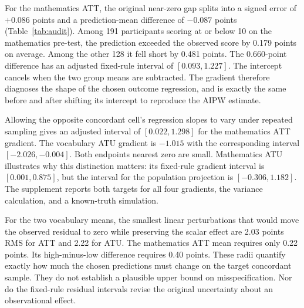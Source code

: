 For the mathematics ATT, the original near-zero gap splits into a signed error of $+0.086$ points and a prediction-mean difference of $-0.087$ points (Table~\ref{tab:audit}). Among 191 participants scoring at or below 10 on the mathematics pre-test, the prediction exceeded the observed score by 0.179 points on average. Among the other 128 it fell short by 0.481 points. The 0.660-point difference has an adjusted fixed-rule interval of $[0.093,1.227]$. The intercept cancels when the two group means are subtracted. The gradient therefore diagnoses the shape of the chosen outcome regression, and is exactly the same before and after shifting its intercept to reproduce the AIPW estimate.

Allowing the opposite concordant cell's regression slopes to vary under repeated sampling gives an adjusted interval of $[0.022,1.298]$ for the mathematics ATT gradient. The vocabulary ATU gradient is $-1.015$ with the corresponding interval $[-2.026,-0.004]$. Both endpoints nearest zero are small. Mathematics ATU illustrates why this distinction matters: its fixed-rule gradient interval is $[0.001,0.875]$, but the interval for the population projection is $[-0.306,1.182]$. The supplement reports both targets for all four gradients, the variance calculation, and a known-truth simulation.

For the two vocabulary means, the smallest linear perturbations that would move the observed residual to zero while preserving the scalar effect are 2.03 points RMS for ATT and 2.22 for ATU. The mathematics ATT mean requires only 0.22 points. Its high-minus-low difference requires 0.40 points. These radii quantify exactly how much the chosen predictions must change on the target concordant sample. They do not establish a plausible upper bound on misspecification. Nor do the fixed-rule residual intervals revise the original uncertainty about an observational effect.
